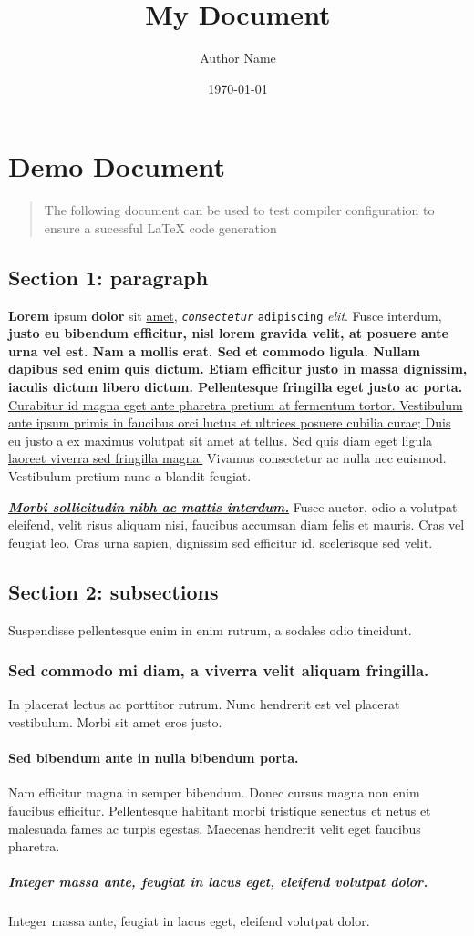 \documentclass{article}
\title{My Document}\author{Author Name}\date{\today}
\begin{document}
\section*{Demo Document}\begin{quote}

The following document can be used to test compiler configuration to ensure a sucessful LaTeX code generation

\end{quote}

\subsection*{Section 1: paragraph}
\textbf{Lorem} ipsum \textbf{dolor} sit \ul{amet}, \texttt{\textit{consectetur}} \texttt{adipiscing} \textit{elit}. Fusce interdum, \textbf{justo eu bibendum efficitur, nisl lorem gravida velit, at posuere ante urna vel est. Nam a mollis erat. Sed et commodo ligula. Nullam dapibus sed enim quis dictum. Etiam efficitur justo in massa dignissim, iaculis dictum libero dictum. Pellentesque fringilla eget justo ac porta.} \ul{Curabitur id magna eget ante pharetra pretium at fermentum tortor. Vestibulum ante ipsum primis in faucibus orci luctus et ultrices posuere cubilia curae; Duis eu justo a ex maximus volutpat sit amet at tellus. Sed quis diam eget ligula laoreet viverra sed fringilla magna.} Vivamus consectetur ac nulla nec euismod. Vestibulum pretium nunc a blandit feugiat.

\ul{\textbf{\textit{Morbi sollicitudin nibh ac mattis interdum.}}} Fusce auctor, odio a volutpat eleifend, velit risus aliquam nisi, faucibus accumsan diam felis et mauris. Cras vel feugiat leo. Cras urna sapien, dignissim sed efficitur id, scelerisque sed velit. 


\subsection*{Section 2: subsections}
Suspendisse pellentesque enim in enim rutrum, a sodales odio tincidunt. 
\subsubsection*{Sed commodo mi diam, a viverra velit aliquam fringilla. }
In placerat lectus ac porttitor rutrum. Nunc hendrerit est vel placerat vestibulum. Morbi sit amet eros justo. 
\paragraph{Sed bibendum ante in nulla bibendum porta. }
Nam efficitur magna in semper bibendum. Donec cursus magna non enim faucibus efficitur. Pellentesque habitant morbi tristique senectus et netus et malesuada fames ac turpis egestas. Maecenas hendrerit velit eget faucibus pharetra.
\subparagraph{Integer massa ante, feugiat in lacus eget, eleifend volutpat dolor.}
Integer massa ante, feugiat in lacus eget, eleifend volutpat dolor. 
\end{document}
